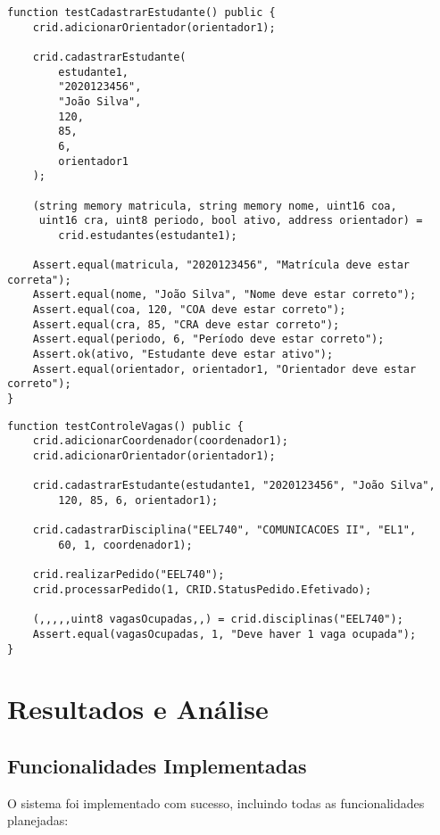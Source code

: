 \documentclass[12pt,a4paper]{article}
\begin{document}
\begin{lstlisting}[caption=Exemplo de Teste - Cadastro de Estudante]
function testCadastrarEstudante() public {
    crid.adicionarOrientador(orientador1);
    
    crid.cadastrarEstudante(
        estudante1,
        "2020123456",
        "João Silva",
        120,
        85,
        6,
        orientador1
    );
    
    (string memory matricula, string memory nome, uint16 coa, 
     uint16 cra, uint8 periodo, bool ativo, address orientador) = 
        crid.estudantes(estudante1);
    
    Assert.equal(matricula, "2020123456", "Matrícula deve estar correta");
    Assert.equal(nome, "João Silva", "Nome deve estar correto");
    Assert.equal(coa, 120, "COA deve estar correto");
    Assert.equal(cra, 85, "CRA deve estar correto");
    Assert.equal(periodo, 6, "Período deve estar correto");
    Assert.ok(ativo, "Estudante deve estar ativo");
    Assert.equal(orientador, orientador1, "Orientador deve estar correto");
}
\end{lstlisting}

\begin{lstlisting}[caption=Exemplo de Teste - Controle de Vagas]
function testControleVagas() public {
    crid.adicionarCoordenador(coordenador1);
    crid.adicionarOrientador(orientador1);
    
    crid.cadastrarEstudante(estudante1, "2020123456", "João Silva", 
        120, 85, 6, orientador1);
    
    crid.cadastrarDisciplina("EEL740", "COMUNICACOES II", "EL1", 
        60, 1, coordenador1);
    
    crid.realizarPedido("EEL740");
    crid.processarPedido(1, CRID.StatusPedido.Efetivado);
    
    (,,,,,uint8 vagasOcupadas,,) = crid.disciplinas("EEL740");
    Assert.equal(vagasOcupadas, 1, "Deve haver 1 vaga ocupada");
}
\end{lstlisting}

\section{Resultados e Análise}

\subsection{Funcionalidades Implementadas}

O sistema foi implementado com sucesso, incluindo todas as funcionalidades planejadas:
\end{document}

